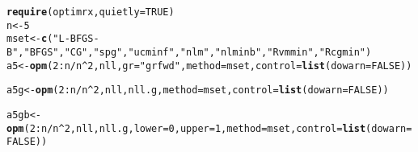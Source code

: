 \documentclass[11pt]{article}\usepackage[]{graphicx}\usepackage[]{color}
\makeatletter
\newcommand{\hlnum}[1]{\textcolor[rgb]{0.686,0.059,0.569}{#1}}%
\newcommand{\hlstr}[1]{\textcolor[rgb]{0.192,0.494,0.8}{#1}}%
\newcommand{\hlopt}[1]{\textcolor[rgb]{0,0,0}{#1}}%
\newcommand{\hlstd}[1]{\textcolor[rgb]{0.345,0.345,0.345}{#1}}%
\newcommand{\hlkwb}[1]{\textcolor[rgb]{0.69,0.353,0.396}{#1}}%
\newcommand{\hlkwc}[1]{\textcolor[rgb]{0.333,0.667,0.333}{#1}}%
\newcommand{\hlkwd}[1]{\textcolor[rgb]{0.737,0.353,0.396}{\textbf{#1}}}%
\newenvironment{kframe}{%
 \def\at@end@of@kframe{}%
 \ifinner\ifhmode%
  \def\at@end@of@kframe{\end{minipage}}%
  \begin{minipage}{\columnwidth}%
 \fi\fi%
 \def\FrameCommand##1{\hskip\@totalleftmargin \hskip-\fboxsep
 \colorbox{shadecolor}{##1}\hskip-\fboxsep
     \hskip-\linewidth \hskip-\@totalleftmargin \hskip\columnwidth}%
 \MakeFramed {\advance\hsize-\width
   \@totalleftmargin\z@ \linewidth\hsize
   \@setminipage}}%
 {\par\unskip\endMakeFramed%
 \at@end@of@kframe}
\newenvironment{knitrout}{}{} %
\makeatother
\begin{document}
\begin{knitrout}\scriptsize
{}\color{fgcolor}\begin{kframe}
\begin{alltt}
\hlkwd{require}\hlstd{(optimrx,} \hlkwc{quietly}\hlstd{=}\hlnum{TRUE}\hlstd{)}
\hlstd{n}\hlkwb{<-}\hlnum{5}
\hlstd{mset}\hlkwb{<-}\hlkwd{c}\hlstd{(}\hlstr{"L-BFGS-B"}\hlstd{,} \hlstr{"BFGS"}\hlstd{,} \hlstr{"CG"}\hlstd{,} \hlstr{"spg"}\hlstd{,} \hlstr{"ucminf"}\hlstd{,} \hlstr{"nlm"}\hlstd{,} \hlstr{"nlminb"}\hlstd{,} \hlstr{"Rvmmin"}\hlstd{,} \hlstr{"Rcgmin"}\hlstd{)}
\hlstd{a5}\hlkwb{<-}\hlkwd{opm}\hlstd{(}\hlnum{2}\hlopt{:}\hlstd{n}\hlopt{/}\hlstd{n}\hlopt{^}\hlnum{2}\hlstd{, nll,} \hlkwc{gr}\hlstd{=}\hlstr{"grfwd"}\hlstd{,} \hlkwc{method}\hlstd{=mset,} \hlkwc{control}\hlstd{=}\hlkwd{list}\hlstd{(}\hlkwc{dowarn}\hlstd{=}\hlnum{FALSE}\hlstd{))}
\end{alltt}


{\ttfamily\noindent\color{warningcolor}{\#\# Warning in Rvmminu(par = spar, fn = efn, gr = egr, control = mcontrol, ...): Too many gradient evaluations}}\begin{alltt}
\hlstd{a5g}\hlkwb{<-}\hlkwd{opm}\hlstd{(}\hlnum{2}\hlopt{:}\hlstd{n}\hlopt{/}\hlstd{n}\hlopt{^}\hlnum{2}\hlstd{, nll, nll.g,} \hlkwc{method}\hlstd{=mset,} \hlkwc{control}\hlstd{=}\hlkwd{list}\hlstd{(}\hlkwc{dowarn}\hlstd{=}\hlnum{FALSE}\hlstd{))}
\end{alltt}


{\ttfamily\noindent\color{warningcolor}{\#\# Warning in Rvmminu(par = spar, fn = efn, gr = egr, control = mcontrol, ...): Too many gradient evaluations}}\begin{alltt}
\hlstd{a5gb}\hlkwb{<-}\hlkwd{opm}\hlstd{(}\hlnum{2}\hlopt{:}\hlstd{n}\hlopt{/}\hlstd{n}\hlopt{^}\hlnum{2}\hlstd{, nll, nll.g,} \hlkwc{lower}\hlstd{=}\hlnum{0}\hlstd{,} \hlkwc{upper}\hlstd{=}\hlnum{1}\hlstd{,} \hlkwc{method}\hlstd{=mset,} \hlkwc{control}\hlstd{=}\hlkwd{list}\hlstd{(}\hlkwc{dowarn}\hlstd{=}\hlnum{FALSE}\hlstd{))}
\end{alltt}


{\ttfamily\noindent\color{warningcolor}{\#\# Warning in optimr(par, fn, gr, method = meth, lower = lower, upper = upper, : optimr: optim() with bounds ONLY uses L-BFGS-B}}


\end{kframe}
\end{knitrout}
\end{document}
